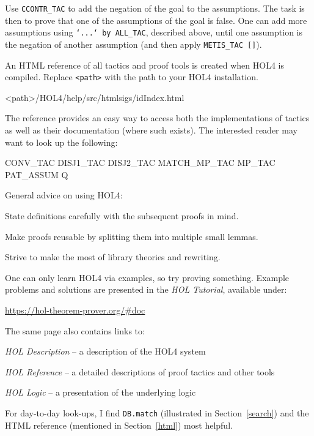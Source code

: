\documentclass[a4paper,10pt]{article}
\begin{document}

Use {\tt\small CCONTR\_TAC} to add the negation of the goal to the
assumptions.  The task is then to prove that one of the assumptions of
the goal is false. One can \eg{} add more assumptions using
{\tt\small `...` by ALL\_TAC}, described above, until one assumption is the
negation of another assumption (and then apply {\tt\small METIS\_TAC []}).


An HTML reference of all tactics and proof tools is created when HOL4 is compiled.
Replace {\tt\small <path>} with the path to your HOL4 installation.
\begin{code}
<path>/HOL4/help/src/htmlsigs/idIndex.html
\end{code}
The reference provides an easy way to access both the implementations of
tactics as well as their documentation (where such exists).
The interested reader may want to look up the following:
\begin{code}
CONV_TAC  DISJ1_TAC  DISJ2_TAC  MATCH_MP_TAC  MP_TAC  PAT_ASSUM  Q
\end{code}


General advice on using HOL4:
\begin{enum}
\item State definitions carefully with the subsequent proofs in mind.
\item Make proofs reusable by splitting them into multiple small lemmas.
\item Strive to make the most of library theories and rewriting.
\end{enum}
One can only learn HOL4 via examples, so try proving something.
Example problems and solutions are presented in the \emph{HOL
  Tutorial}, available under:
\begin{center}
\url{https://hol-theorem-prover.org/#doc}
\end{center}
The same page also contains links to:
\begin{enum}
\item[~]\emph{HOL Description} -- a description of the HOL4 system
\item[~]\emph{HOL Reference} -- a detailed descriptions of proof tactics and other tools
\item[~]\emph{HOL Logic} -- a presentation of the underlying logic
\end{enum}
For day-to-day look-ups, I find {\tt DB.match} (illustrated in
Section~\ref{search}) and the HTML reference (mentioned in
Section~\ref{html}) most helpful.
\end{document}
